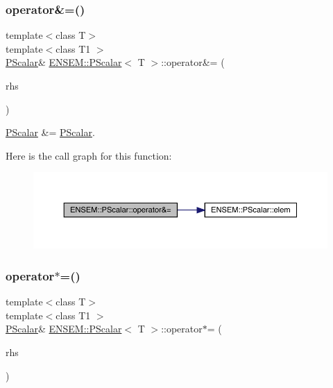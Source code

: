\subsubsection{\texorpdfstring{operator\&=()}{operator\&=()}\hspace{0.1cm}{\footnotesize\ttfamily [2/2]}}
{\footnotesize\ttfamily template$<$class T$>$ \\
template$<$class T1 $>$ \\
\mbox{\hyperlink{classENSEM_1_1PScalar}{P\+Scalar}}\& \mbox{\hyperlink{classENSEM_1_1PScalar}{E\+N\+S\+E\+M\+::\+P\+Scalar}}$<$ T $>$\+::operator\&= (\begin{DoxyParamCaption}\item[{const \mbox{\hyperlink{classENSEM_1_1PScalar}{P\+Scalar}}$<$ T1 $>$ \&}]{rhs }\end{DoxyParamCaption})\hspace{0.3cm}{\ttfamily [inline]}}



\mbox{\hyperlink{classENSEM_1_1PScalar}{P\+Scalar}} \&= \mbox{\hyperlink{classENSEM_1_1PScalar}{P\+Scalar}}. 

Here is the call graph for this function\+:
\nopagebreak
\begin{figure}[H]
\begin{center}
\leavevmode
\includegraphics[width=350pt]{d3/d27/classENSEM_1_1PScalar_a9c683c36c7129b6b016af09f8d5cda42_cgraph}
\end{center}
\end{figure}
\mbox{\label{classENSEM_1_1PScalar_addccfa9164f9d80554657387932185c4}} 
\subsubsection{\texorpdfstring{operator$\ast$=()}{operator*=()}\hspace{0.1cm}{\footnotesize\ttfamily [1/2]}}
{\footnotesize\ttfamily template$<$class T$>$ \\
template$<$class T1 $>$ \\
\mbox{\hyperlink{classENSEM_1_1PScalar}{P\+Scalar}}\& \mbox{\hyperlink{classENSEM_1_1PScalar}{E\+N\+S\+E\+M\+::\+P\+Scalar}}$<$ T $>$\+::operator$\ast$= (\begin{DoxyParamCaption}\item[{const \mbox{\hyperlink{classENSEM_1_1PScalar}{P\+Scalar}}$<$ T1 $>$ \&}]{rhs }\end{DoxyParamCaption})\hspace{0.3cm}{\ttfamily [inline]}}




